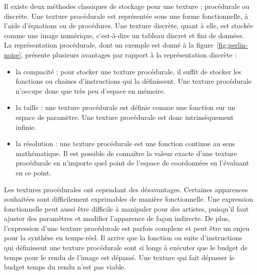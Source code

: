 \bigskip

Il existe deux méthodes classiques de stockage pour une texture : procédurale ou discrète. Une texture procédurale est représentée sous une forme fonctionnelle, à l'aide d'équations ou de procédures. Une texture discrète, quant à elle, est stockée comme une image numérique, c'est-à-dire un tableau discret et fini de données. La représentation procédurale, dont un exemple est donné à la figure~\ref{fig:perlin-noise}, présente plusieurs avantages par rapport à la représentation discrète :

\begin{itemize}
    \item la compacité : pour stocker une texture procédurale, il suffit de stocker les fonctions ou chaines d'instructions qui la définissent. Une texture procédurale n'occupe donc que très peu d'espace en mémoire.
    \item la taille : une texture procédurale est définie comme une fonction sur un espace de paramètre. Une texture procédurale est donc intrinsèquement infinie.
    \item la résolution : une texture procédurale est une fonction continue au sens mathématique. Il est possible de connaître la valeur exacte d'une texture procédurale en n'importe quel point de l'espace de coordonnées en l'évaluant en ce point.
\end{itemize}

Les textures procédurales ont cependant des désavantages. Certaines apparences souhaitées sont difficilement exprimables de manière fonctionnelle. Une expression fonctionnelle peut aussi être difficile à manipuler pour des artistes, puisqu'il faut ajuster des paramètres et modifier l'apparence de façon indirecte. De plus, l'expression d'une texture procédurale est parfois complexe et peut être un enjeu pour la synthèse en temps-réel. Il arrive que la fonction ou suite d'instructions qui définissent une texture procédurale sont si longs à exécuter que le budget de temps pour le rendu de l'image est dépassé. Une texture qui fait dépasser le budget temps du rendu n'est pas viable.

\bigskip

